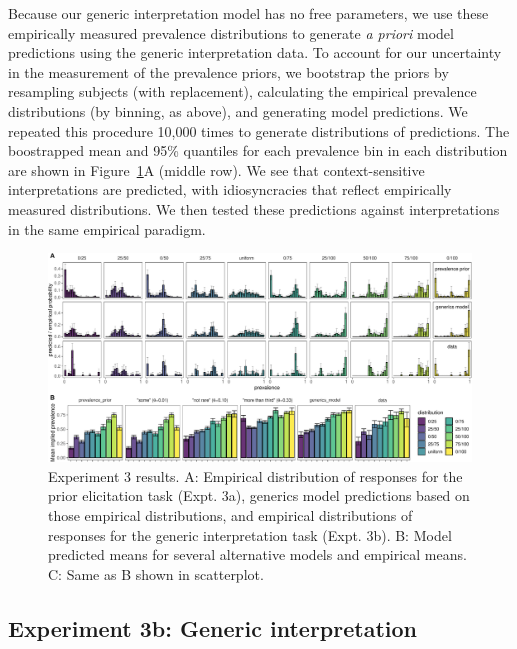 \documentclass[,man,floatsintext]{apa6}
\theoremstyle{definition}
\theoremstyle{definition}
\theoremstyle{definition}
\theoremstyle{remark}
\begin{document}
Because our generic interpretation model has no free parameters, we use
these empirically measured prevalence distributions to generate \emph{a
priori} model predictions using the generic interpretation data. To
account for our uncertainty in the measurement of the prevalence priors,
we bootstrap the priors by resampling subjects (with replacement),
calculating the empirical prevalence distributions (by binning, as
above), and generating model predictions. We repeated this procedure
10,000 times to generate distributions of predictions. The boostrapped
mean and 95\% quantiles for each prevalence bin in each distribution are
shown in Figure~\ref{fig:priorManipulationResults}A (middle row). We see
that context-sensitive interpretations are predicted, with
idiosyncracies that reflect empirically measured distributions. We then
tested these predictions against interpretations in the same empirical
paradigm.

\begin{figure}
\centering
\includegraphics{genint_files/figure-latex/priorManipulationResults-1.pdf}
\caption{\label{fig:priorManipulationResults}Experiment 3 results. A:
Empirical distribution of responses for the prior elicitation task
(Expt. 3a), generics model predictions based on those empirical
distributions, and empirical distributions of responses for the generic
interpretation task (Expt. 3b). B: Model predicted means for several
alternative models and empirical means. C: Same as B shown in
scatterplot.}
\end{figure}

\hypertarget{experiment-3b-generic-interpretation}{%
\subsection{Experiment 3b: Generic
interpretation}\label{experiment-3b-generic-interpretation}}
\end{document}
